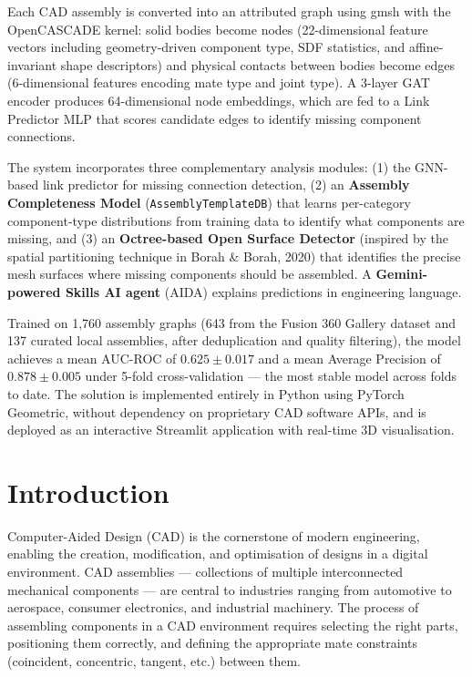 \documentclass[12pt]{report}
\begin{document}
Each CAD assembly is converted into an attributed graph using gmsh with the OpenCASCADE kernel: solid bodies become nodes (22-dimensional feature vectors including geometry-driven component type, SDF statistics, and affine-invariant shape descriptors) and physical contacts between bodies become edges (6-dimensional features encoding mate type and joint type). A 3-layer GAT encoder produces 64-dimensional node embeddings, which are fed to a Link Predictor MLP that scores candidate edges to identify missing component connections.

The system incorporates three complementary analysis modules: (1) the GNN-based link predictor for missing connection detection, (2) an \textbf{Assembly Completeness Model} (\texttt{AssemblyTemplateDB}) that learns per-category component-type distributions from training data to identify what components are missing, and (3) an \textbf{Octree-based Open Surface Detector} (inspired by the spatial partitioning technique in Borah \& Borah, 2020) that identifies the precise mesh surfaces where missing components should be assembled. A \textbf{Gemini-powered Skills AI agent} (AIDA) explains predictions in engineering language.

Trained on 1,760 assembly graphs (643 from the Fusion 360 Gallery dataset and 137 curated local assemblies, after deduplication and quality filtering), the model achieves a mean AUC-ROC of $0.625 \pm 0.017$ and a mean Average Precision of $0.878 \pm 0.005$ under 5-fold cross-validation --- the most stable model across folds to date. The solution is implemented entirely in Python using PyTorch Geometric, without dependency on proprietary CAD software APIs, and is deployed as an interactive Streamlit application with real-time 3D visualisation.

\newpage

\tableofcontents
\newpage
\listoffigures
\newpage
\listoftables
\newpage

\chapter{Introduction}

Computer-Aided Design (CAD) is the cornerstone of modern engineering, enabling the creation, modification, and optimisation of designs in a digital environment. CAD assemblies --- collections of multiple interconnected mechanical components --- are central to industries ranging from automotive to aerospace, consumer electronics, and industrial machinery. The process of assembling components in a CAD environment requires selecting the right parts, positioning them correctly, and defining the appropriate mate constraints (coincident, concentric, tangent, etc.) between them.
\end{document}
